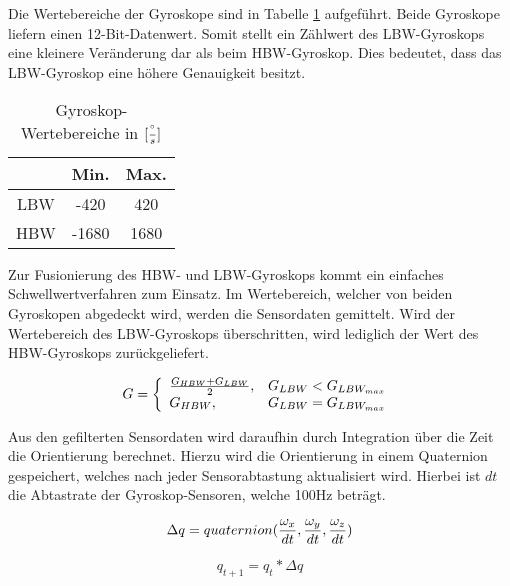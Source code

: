 Die Wertebereiche der Gyroskope sind
in Tabelle \ref{tab:ranges-gyros} aufgeführt. Beide Gyroskope liefern
einen 12-Bit-Datenwert. Somit stellt ein Zählwert des \ac{LBW}-Gyroskops eine
kleinere Veränderung dar als beim \ac{HBW}-Gyroskop.
Dies bedeutet, dass das \ac{LBW}-Gyroskop eine höhere Genauigkeit besitzt.

\begin{table}[ht]
  \centering
  \begin{tabular}{ | c | c | c | }
    \hline
    & Min. & Max. \\ \hline
    \ac{LBW} & -420   & 420   \\ \hline
    \ac{HBW} & -1680   & 1680   \\
    \hline
  \end{tabular}
  \caption{Gyroskop-Wertebereiche in $[{\degree \over s}]$}
  \label{tab:ranges-gyros}
\end{table}


Zur Fusionierung des \ac{HBW}- und \ac{LBW}-Gyroskops kommt ein einfaches Schwellwertverfahren zum Einsatz. 
Im Wertebereich, welcher von beiden Gyroskopen abgedeckt wird, werden
die Sensordaten gemittelt. Wird der Wertebereich des \ac{LBW}-Gyroskops
überschritten, wird lediglich der Wert des \ac{HBW}-Gyroskops
zurückgeliefert.

\begin{equation}
    G = \left\{
    \begin{array}{ll}
        \frac{G_{HBW} + G_{LBW}}{2}, & G_{LBW} < G_{LBW_{max}}  \\
        G_{HBW}, & G_{LBW} = G_{LBW_{max}}
    \end{array}\right. \\
\end{equation}


Aus den gefilterten Sensordaten wird daraufhin durch Integration über
die Zeit die Orientierung berechnet. Hierzu wird die Orientierung in einem Quaternion gespeichert, welches nach jeder Sensorabtastung aktualisiert wird. Hierbei ist $dt$ die Abtastrate der Gyroskop-Sensoren, welche 100Hz beträgt.

\begin{equation}
    \Delta q = quaternion({\omega_x \over dt}, {\omega_y \over dt}, {\omega_z \over dt}) \\
\end{equation}

\begin{equation}
    q_{t+1} = q_t * \Delta q
\end{equation}


